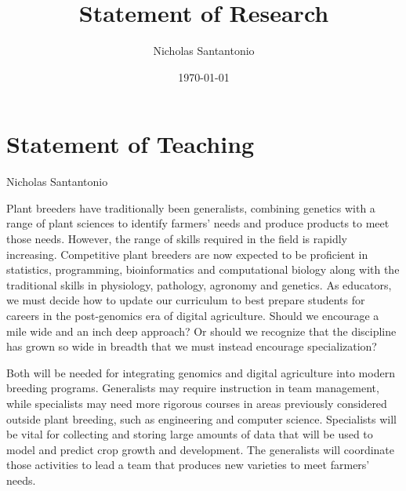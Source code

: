 \documentclass[11pt]{article}
\title{Statement of Research}
\author{Nicholas Santantonio}
\date{\today}
\begin{document}
\section*{\centering Statement of Teaching}
\begin{center} Nicholas Santantonio \end{center}

\noindent Plant breeders have traditionally been generalists, combining genetics with a range of plant sciences to identify farmers' needs and produce products to meet those needs. However, the range of skills required in the field is rapidly increasing. Competitive plant breeders are now expected to be proficient in statistics, programming, bioinformatics and computational biology along with the traditional skills in physiology, pathology, agronomy and genetics. As educators, we must decide how to update our curriculum to best prepare students for careers in the post-genomics era of digital agriculture. Should we encourage a mile wide and an inch deep approach? Or should we recognize that the discipline has grown so wide in breadth that we must instead encourage specialization? 

Both will be needed for integrating genomics and digital agriculture into modern breeding programs. Generalists may require instruction in team management, while specialists may need more rigorous courses in areas previously considered outside plant breeding, such as engineering and computer science. Specialists will be vital for collecting and storing large amounts of data that will be used to model and predict crop growth and development. The generalists will coordinate those activities to lead a team that produces new varieties to meet farmers' needs. %


\end{document}
